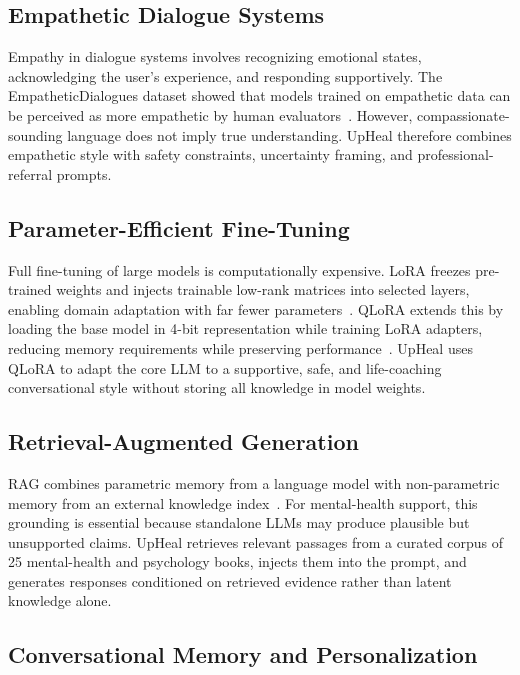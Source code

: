 \documentclass[12pt,a4paper,oneside,openany]{report}
\begin{document}
\subsection{Empathetic Dialogue Systems}

Empathy in dialogue systems involves recognizing emotional states, acknowledging the user's experience, and responding supportively. The EmpatheticDialogues dataset showed that models trained on empathetic data can be perceived as more empathetic by human evaluators~\cite{rashkin2018empathetic}. However, compassionate-sounding language does not imply true understanding. UpHeal therefore combines empathetic style with safety constraints, uncertainty framing, and professional-referral prompts.

\subsection{Parameter-Efficient Fine-Tuning}

Full fine-tuning of large models is computationally expensive. LoRA freezes pre-trained weights and injects trainable low-rank matrices into selected layers, enabling domain adaptation with far fewer parameters~\cite{hu2021lora}. QLoRA extends this by loading the base model in 4-bit representation while training LoRA adapters, reducing memory requirements while preserving performance~\cite{dettmers2022qlora}. UpHeal uses QLoRA to adapt the core LLM to a supportive, safe, and life-coaching conversational style without storing all knowledge in model weights.

\subsection{Retrieval-Augmented Generation}

RAG combines parametric memory from a language model with non-parametric memory from an external knowledge index~\cite{lewis2020rag}. For mental-health support, this grounding is essential because standalone LLMs may produce plausible but unsupported claims. UpHeal retrieves relevant passages from a curated corpus of 25 mental-health and psychology books, injects them into the prompt, and generates responses conditioned on retrieved evidence rather than latent knowledge alone.

\subsection{Conversational Memory and Personalization}
\end{document}
